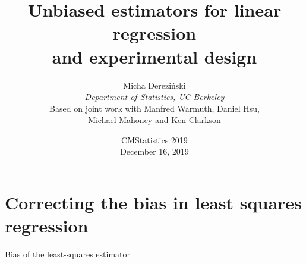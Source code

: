 \documentclass{beamer}
\title[]{Unbiased estimators for linear regression \\
  and experimental design}
\author[]{Micha{\polishl } Derezi\'{n}ski\\
  \textit{Department of Statistics, UC Berkeley}\\[4mm]
  \footnotesize Based on joint work with Manfred Warmuth, Daniel Hsu, \\
Michael Mahoney and Ken Clarkson}
\date{CMStatistics 2019\\
  December 16, 2019}
\begin{document}
\begin{frame}
  \titlepage
\end{frame}

\linespread{1.3}

\section{Correcting the bias in least squares regression}

\begin{frame}{Bias of the least-squares estimator}
\begin{columns}
\begin{column}{0.45\textwidth}
\end{column}
\end{columns}
\end{frame}
\end{document}
